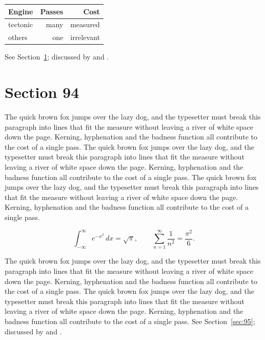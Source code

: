 \documentclass{article}
\begin{document}
\begin{center}
\begin{tabular}{lrr}
\toprule
Engine & Passes & Cost \\
\midrule
tectonic & many & measured \\
others & one & irrelevant \\
\bottomrule
\end{tabular}
\end{center}

See Section~\ref{sec:94}; discussed by \textcite{k4} and \textcite{l1}.
\section{Section 94}
\label{sec:94}
The quick brown fox jumps over the lazy dog, and the typesetter must break this paragraph into lines that fit the measure without leaving a river of white space down the page. Kerning, hyphenation and the badness function all contribute to the cost of a single pass. The quick brown fox jumps over the lazy dog, and the typesetter must break this paragraph into lines that fit the measure without leaving a river of white space down the page. Kerning, hyphenation and the badness function all contribute to the cost of a single pass. The quick brown fox jumps over the lazy dog, and the typesetter must break this paragraph into lines that fit the measure without leaving a river of white space down the page. Kerning, hyphenation and the badness function all contribute to the cost of a single pass. 

\begin{equation}\label{eq:94}
\int_{-\infty}^{\infty} e^{-x^{2}}\,dx = \sqrt{\pi}, \qquad
\sum_{n=1}^{\infty} \frac{1}{n^{2}} = \frac{\pi^{2}}{6}.
\end{equation}

The quick brown fox jumps over the lazy dog, and the typesetter must break this paragraph into lines that fit the measure without leaving a river of white space down the page. Kerning, hyphenation and the badness function all contribute to the cost of a single pass. The quick brown fox jumps over the lazy dog, and the typesetter must break this paragraph into lines that fit the measure without leaving a river of white space down the page. Kerning, hyphenation and the badness function all contribute to the cost of a single pass. 
See Section~\ref{sec:95}; discussed by \textcite{k5} and \textcite{l2}.
\end{document}
